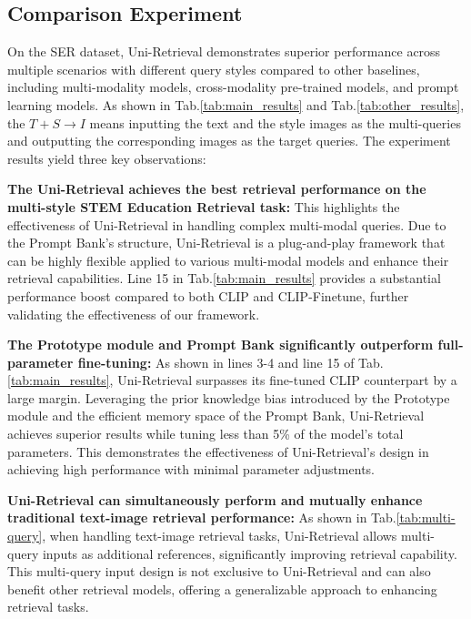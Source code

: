 \subsection{Comparison Experiment}

On the SER dataset, Uni-Retrieval demonstrates superior performance across multiple scenarios with different query styles compared to other baselines, including multi-modality models, cross-modality pre-trained models, and prompt learning models. As shown in Tab.\ref{tab:main_results} and Tab.\ref{tab:other_results}, the $T+S\!\rightarrow\!I$ means inputting the text and the style images as the multi-queries and outputting the corresponding images as the target queries. The experiment results yield three key observations:

\noindent \textbf{The Uni-Retrieval achieves the best retrieval performance on the multi-style STEM Education Retrieval task:} This highlights the effectiveness of Uni-Retrieval in handling complex multi-modal queries. Due to the Prompt Bank's structure, Uni-Retrieval is a plug-and-play framework that can be highly flexible applied to various multi-modal models and enhance their retrieval capabilities. Line 15 in Tab.\ref{tab:main_results} provides a substantial performance boost compared to both CLIP and CLIP-Finetune, further validating the effectiveness of our framework.

\noindent \textbf{The Prototype module and Prompt Bank significantly outperform full-parameter fine-tuning:} As shown in lines 3-4 and line 15 of Tab.\ref{tab:main_results}, Uni-Retrieval surpasses its fine-tuned CLIP counterpart by a large margin. Leveraging the prior knowledge bias introduced by the Prototype module and the efficient memory space of the Prompt Bank, Uni-Retrieval achieves superior results while tuning less than 5\% of the model’s total parameters. This demonstrates the effectiveness of Uni-Retrieval’s design in achieving high performance with minimal parameter adjustments.

\noindent \textbf{Uni-Retrieval can simultaneously perform and mutually enhance traditional text-image retrieval performance:} As shown in Tab.\ref{tab:multi-query}, when handling text-image retrieval tasks, Uni-Retrieval allows multi-query inputs as additional references, significantly improving retrieval capability. This multi-query input design is not exclusive to Uni-Retrieval and can also benefit other retrieval models, offering a generalizable approach to enhancing retrieval tasks.

